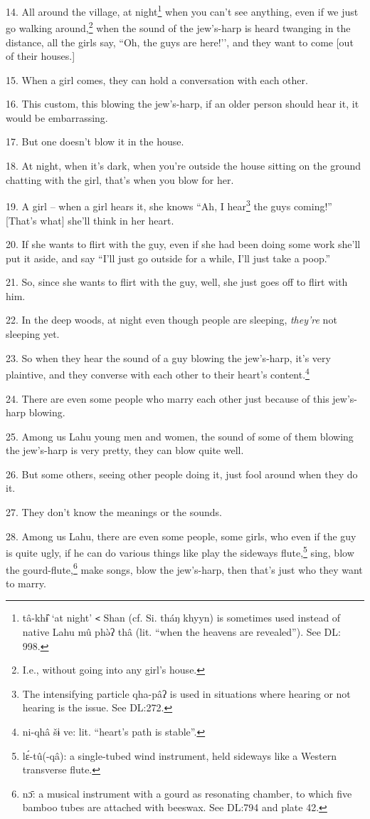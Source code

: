 14. All around the village, at night\footnote{tâ-khɨ̂ `at night' \texttt{<} Shan (cf. Si. tháŋ khyyn) is sometimes used instead of native Lahu mû phə̀ʔ thâ (lit. “when the heavens are revealed”). See DL: 998.} when you can't see anything, even if we just go walking around,\footnote{I.e., without going into any girl's house.} when the sound of the jew's-harp is heard twanging in the distance, all the girls say, ``Oh, the guys are here!’’, and they want to come [out of their houses.]

15. When a girl comes, they can hold a conversation with each other.

16. This custom, this blowing the jew's-harp, if an older person should hear it, it would be embarrassing.

17. But one doesn't blow it in the house.

18. At night, when it's dark, when you're outside the house sitting on the ground
chatting with the girl, that's when you blow for her.

19. A girl -- when a girl hears it, she knows ``Ah, I hear\footnote{The intensifying particle qha-pâʔ is used in situations where hearing or not hearing is the issue. See DL:272.} the guys coming!'' [That's what] she'll think in her heart.

20. If she wants to flirt with the guy, even if she had been doing some work she'll put it aside, and say ``I'll just go outside for a while, I'll just take a poop.''

21. So, since she wants to flirt with the guy, well, she just goes off to flirt with him.

22. In the deep woods, at night even though people are sleeping, \textit{they're} not sleeping yet.

23. So when they hear the sound of a guy blowing the jew's-harp, it's very plaintive, and they converse with each other to their heart's content.\footnote{ni-qhâ šɨ ve: lit. ``heart's path is stable''.}

24. There are even some people who marry each other just because of this jew's-harp blowing.

25. Among us Lahu young men and women, the sound of some of them blowing the jew's-harp is very pretty, they can blow quite well.

26. But some others, seeing other people doing it, just fool around when they do it.

27. They don't know the meanings or the sounds.

28. Among us Lahu, there are even some people, some girls, who even if the guy is quite ugly, if he can do various things like play the sideways flute,\footnote{lɛ́-tû(-qâ): a single-tubed wind instrument, held sideways like a Western transverse flute.} sing, blow the gourd-flute,\footnote{nɔ̄: a musical instrument with a gourd as resonating chamber, to which five bamboo tubes are attached with beeswax. See DL:794 and plate 42.} make songs, blow the jew's-harp, then that's just who they want to marry.

